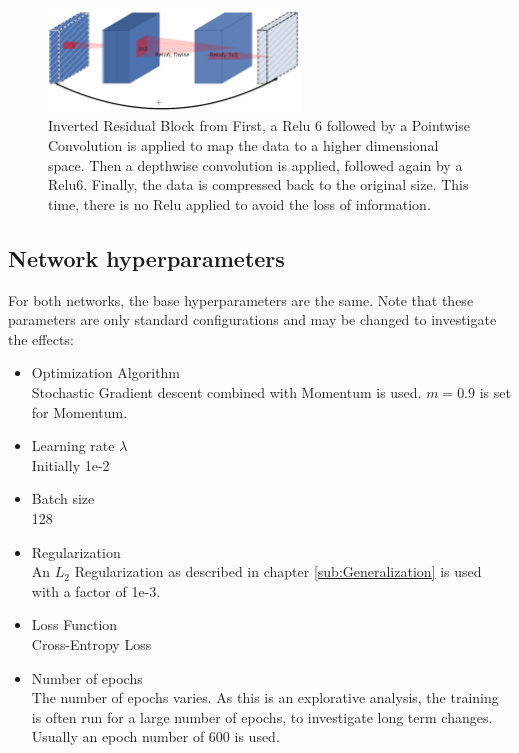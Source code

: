 \begin{figure}[h]
    \centering
    \includegraphics[width=0.6\textwidth]{images/Inverted_Residual.png}
    \caption{Inverted Residual Block from \cite[Page 3]{sandler2018mobilenetv2}\newline 
    First, a Relu 6 followed by a Pointwise Convolution is applied to map the
     data to a higher dimensional space. Then a depthwise convolution is
     applied, followed again by a Relu6. Finally, the data is compressed back to
     the original size. This time, there is no Relu applied to avoid the loss of
     information.}
     \label{fig:InvRes}
\end{figure}


\subsection{Network hyperparameters}\label{sub:Hyperparameters}
For both networks, the base hyperparameters are the same. Note that these
parameters are only standard configurations and may be changed to investigate
the effects:
\begin{itemize}
    \item Optimization Algorithm \\Stochastic Gradient descent combined with
    Momentum is used. $m=0.9$ is set for Momentum.
    \item Learning rate $\lambda$ \\Initially 1e-2
    \item Batch size \\128
    \item Regularization \\An $L_2$ Regularization as described in chapter
    \ref{sub:Generalization} is used with a factor of 1e-3.
    \item Loss Function \\Cross-Entropy Loss
    \item Number of epochs \\The number of epochs varies. As this is an
    explorative analysis, the training is often run for a large number of
    epochs, to investigate long term changes. Usually an epoch number of 600 is
    used.
\end{itemize}

